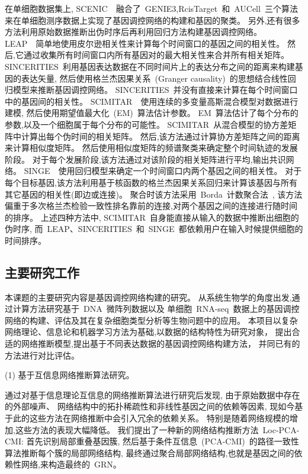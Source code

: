 在单细胞数据集上, 
SCENIC~\cite{aibar2017scenic}~融合了~GENIE3,RcisTarget~和~AUCell~三个算法来在单细胞测序数据上实现了基因调控网络的构建和基因的聚类。
另外,还有很多方法利用原始数据推断出伪时序后再利用回归方法构建基因调控网络。
LEAP~\cite{specht2017leap}~简单地使用皮尔逊相关性来计算每个时间窗口的基因之间的相关性。 
然后,它通过收集所有时间窗口内所有基因对的最大相关性来合并所有相关矩阵。
SINCERITIES~\cite{papili2017sincerities}利用基因表达数据在不同时间片上的表达分布之间的距离来构建基因的表达矢量,
然后使用格兰杰因果关系~(Granger causality)~的思想结合线性回归模型来推断基因调控网络。
SINCERITIES~并没有直接来计算在每个时间窗口中的基因间的相关性。
SCIMITAR~\cite{cordero2017tracing}~使用连续的多变量高斯混合模型对数据进行建模,
然后使用期望值最大化~(EM)~算法估计参数。
EM~算法估计了每个分布的参数,以及一个细胞属于每个分布的可能性。
SCIMITAR~从混合模型的协方差矩阵中计算出每个伪时间的相关矩阵。
然后,该方法通过计算协方差矩阵之间的距离来计算相似度矩阵。
然后使用相似度矩阵的频谱聚类来确定整个时间轨迹的发展阶段。
对于每个发展阶段,该方法通过对该阶段的相关矩阵进行平均,输出共识网络。
SINGE~\cite{deshpande2019network}~使用回归模型来确定一个时间窗口内两个基因之间的相关性。
对于每个目标基因,该方法利用基于核函数的格兰杰因果关系回归来计算该基因与所有其它基因的相关性(即边或连接)。
聚合时该方法采用~Borda~计数聚合法~\cite{van2000variants},
该方法偏重于多次格兰杰检验一致性排名靠前的连接,对两个基因之间的连接进行随时间的排序。
上述四种方法中, SCIMITAR~自身能直接从输入的数据中推断出细胞的伪时序, 
而~LEAP、SINCERITIES~和~SINGE~都依赖用户在输入时候提供细胞的时间排序。

\subsection{主要研究工作}
本课题的主要研究内容是基因调控网络构建的研究。
从系统生物学的角度出发,通过计算方法研究基于~DNA~微阵列数据以及
单细胞~RNA-seq~数据上的基因调控网络的构建、评估及其在复杂细胞类型分析等生物问题中的应用。
本项目以复杂网络理论、信息论和机器学习方法为基础,以数据的结构特性为研究对象，
提出合适的网络推断模型,提出基于不同表达数据的基因调控网络构建方法，
并同已有的方法进行对比评估。

(1) 基于互信息网络推断算法研究。

通过对基于信息理论互信息的网络推断算法进行研究后发现,
由于原始数据中存在的外部噪声、
网络结构中的拓扑稀疏性和非线性基因之间的依赖等因素,
现如今基于此的这些方法在网络推断中会引入冗余的依赖关系。
特别是随着网络规模的增加,这些方法的表现大幅降低。
我们提出了一种新的网络结构推断方法~Loc-PCA-CMI:
首先识别局部重叠基因簇,
然后基于条件互信息~(PCA-CMI)~的路径一致性算法推断每个簇的局部网络结构,
最终通过聚合局部网络结构,也就是基因之间的依赖性网络,来构造最终的~GRN。

